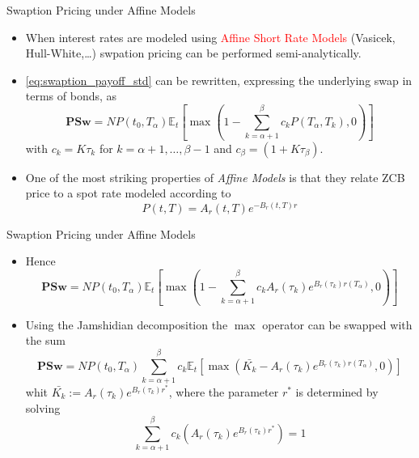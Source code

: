 \documentclass{beamer}
\begin{document}
\begin{frame}{Swaption Pricing under Affine Models}
\begin{itemize}
	\item When interest rates are modeled using \textcolor{red}{Affine Short Rate Models} (Vasicek, Hull-White,\ldots) swpation pricing can be performed semi-analytically.
	\item \cref{eq:swaption_payoff_std} can be rewritten, expressing the underlying swap in terms of bonds, as
\begin{equation*}
\textbf{PSw}=NP(t_0, T_\alpha)\mathbb{E}_t\left[\max\left(1-\sum_{k=\alpha+1}^\beta c_kP(T_\alpha,T_k), 0\right)\right]
\end{equation*}
with $c_k=K\tau_k$ for $k=\alpha+1,\ldots,\beta-1$ and $c_\beta=(1+K\tau_\beta)$.
	\item One of the most striking properties of \emph{Affine Models} is that they relate ZCB price to a spot rate modeled according to 
	\begin{equation*}
		P(t,T) = A_r(t,T)e^{-B_r(t,T)r}
	\end{equation*} 
\end{itemize}
\end{frame}

\begin{frame}{Swaption Pricing under Affine Models}
\begin{itemize}
\item Hence
\begin{equation*}
\textbf{PSw}=NP(t_0, T_\alpha)\mathbb{E}_t\left[\max\left(1-\sum_{k=\alpha+1}^\beta c_k A_r(\tau_k)e^{B_r(\tau_k)r(T_\alpha)}, 0\right)\right]
\end{equation*}
	\item Using the Jamshidian decomposition the $\max$ operator can be swapped with the sum
\begin{equation*}
\textbf{PSw}=NP(t_0, T_\alpha)\sum_{k=\alpha+1}^\beta c_k \mathbb{E}_t\left[\max\left(\bar{K_k} - A_r(\tau_k)e^{B_r(\tau_k)r(T_\alpha)}, 0\right)\right]
\end{equation*}
whit $\bar{K_k} := A_r(\tau_k)e^{B_r(\tau_k)r^{*}}$, where the parameter $r^{*}$ is determined by solving
\begin{equation*}
\sum_{k=\alpha+1}^\beta c_k \left(A_r(\tau_k)e^{B_r(\tau_k)r^{*}}\right) = 1
\end{equation*}
\end{itemize}
\end{frame}
\end{document}
